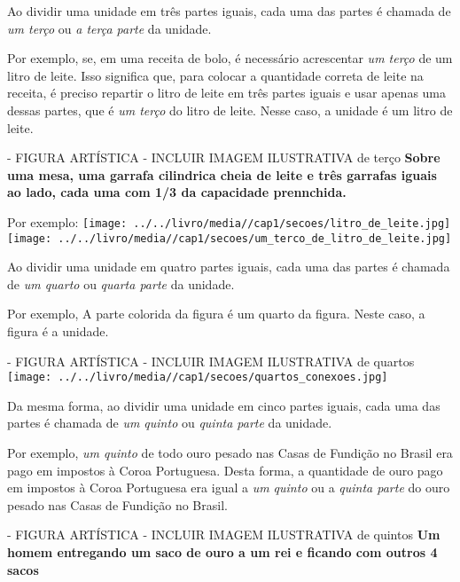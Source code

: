 \documentclass[a4,12pt]{book}
\begin{document}
Ao dividir uma unidade em três partes iguais, cada uma das partes é chamada de {\it um terço} ou {\it a terça parte} da unidade. 

Por exemplo, se, em uma receita de bolo, é necessário acrescentar {\it um terço} de um litro de leite. Isso significa que, para colocar a quantidade correta de leite na receita, é preciso repartir o litro de leite em três partes iguais e usar apenas uma dessas partes, que é {\it um terço} do litro de leite. Nesse caso, a unidade é um litro de leite.

\begin{imagem*}[breakable]{}{}   - FIGURA ARTÍSTICA - INCLUIR IMAGEM ILUSTRATIVA de terço   
  {\bf Sobre uma mesa, uma garrafa cilindrica cheia de leite e três garrafas iguais ao lado, cada uma com 1/3 da capacidade prennchida.}  
  
  Por exemplo:   
    \texttt{[image: ../../livro/media//cap1/secoes/litro\_de\_leite.jpg]}  
    \texttt{[image: ../../livro/media//cap1/secoes/um\_terco\_de\_litro\_de\_leite.jpg]}  
  
\end{imagem*}

Ao dividir uma unidade em quatro partes iguais, cada uma das partes é chamada de {\it um quarto} ou {\it quarta parte} da unidade. 

Por exemplo,
A parte colorida da figura é um quarto da figura. Neste caso, a figura é a unidade.

\begin{imagem*}[breakable]{}{}   - FIGURA ARTÍSTICA - INCLUIR IMAGEM ILUSTRATIVA de quartos  
    \texttt{[image: ../../livro/media//cap1/secoes/quartos\_conexoes.jpg]}  
   \end{imagem*}

Da mesma forma, ao dividir uma unidade em cinco partes iguais, cada uma das partes é chamada de {\it um quinto} ou {\it quinta parte} da unidade.

Por exemplo,
{\it um quinto} de todo ouro pesado nas Casas de Fundição no Brasil era pago em impostos à Coroa Portuguesa. Desta forma, a quantidade de ouro pago em impostos à Coroa Portuguesa era igual a {\it um quinto} ou a {\it quinta parte} do ouro pesado nas Casas de Fundição no Brasil.

\begin{imagem*}[breakable]{}{}   - FIGURA ARTÍSTICA - INCLUIR IMAGEM ILUSTRATIVA de quintos   
  {\bf Um homem entregando um saco de ouro a um rei e ficando com outros 4 sacos}  
\end{imagem*}
\end{document}
